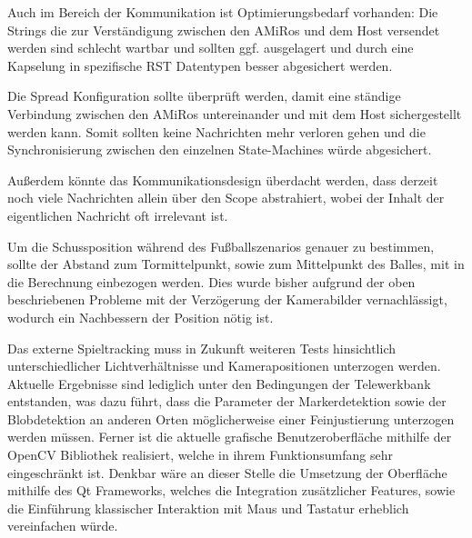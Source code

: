Auch im Bereich der Kommunikation ist Optimierungsbedarf vorhanden: Die Strings die zur Verständigung zwischen den AMiRos und dem Host versendet werden sind schlecht wartbar und sollten ggf. ausgelagert und durch eine Kapselung in spezifische RST Datentypen besser abgesichert werden.

Die Spread Konfiguration sollte überprüft werden, damit eine ständige Verbindung zwischen den AMiRos untereinander und mit dem Host sichergestellt werden kann. Somit sollten keine Nachrichten mehr verloren gehen und die Synchronisierung zwischen den einzelnen State-Machines würde abgesichert.

Außerdem könnte das Kommunikationsdesign überdacht werden, dass derzeit noch viele Nachrichten allein über den Scope abstrahiert, wobei der Inhalt der eigentlichen Nachricht oft irrelevant ist. 

Um die Schussposition während des Fußballszenarios genauer zu bestimmen, sollte der Abstand zum Tormittelpunkt, sowie zum Mittelpunkt des Balles, mit in die Berechnung einbezogen werden. Dies wurde bisher aufgrund der oben beschriebenen Probleme mit der Verzögerung der Kamerabilder vernachlässigt, wodurch ein Nachbessern der Position nötig ist. 

Das externe Spieltracking muss in Zukunft weiteren Tests hinsichtlich unterschiedlicher Lichtverhältnisse und Kamerapositionen unterzogen werden. Aktuelle Ergebnisse sind lediglich unter den Bedingungen der Telewerkbank entstanden, was dazu führt, dass die Parameter der Markerdetektion sowie der Blobdetektion an anderen Orten möglicherweise einer Feinjustierung unterzogen werden müssen.
Ferner ist die aktuelle grafische Benutzeroberfläche mithilfe der OpenCV Bibliothek realisiert, welche in ihrem Funktionsumfang sehr eingeschränkt ist. Denkbar wäre an dieser Stelle die Umsetzung der Oberfläche mithilfe des Qt Frameworks, welches die Integration zusätzlicher Features, sowie die Einführung klassischer Interaktion mit Maus und Tastatur erheblich vereinfachen würde.